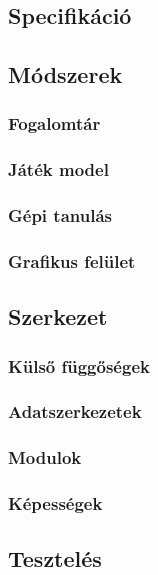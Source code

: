 \documentclass[12pt]{article}
\begin{document}
\subsection{Specifikáció}

\subsection{Módszerek}

\subsubsection{Fogalomtár}

\subsubsection{Játék model}

\subsubsection{Gépi tanulás}

\subsubsection{Grafikus felület}

\subsection{Szerkezet}

\subsubsection{Külső függőségek}

\subsubsection{Adatszerkezetek}

\subsubsection{Modulok}

\subsubsection{Képességek}

\subsection{Tesztelés}
\end{document}
